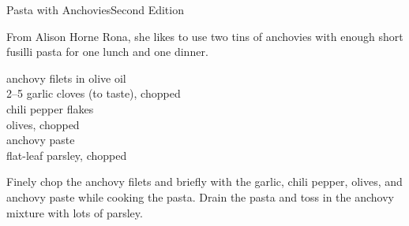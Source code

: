 \begin{entry}{Pasta with Anchovies}{Second Edition}

\begin{open}
  From Alison Horne Rona, she likes to use two tins of anchovies with enough short
  fusilli pasta for one lunch and one dinner.
\end{open}
\begin{ingredients}
    anchovy filets in olive oil\\
    \numrange{2}{5} garlic cloves (to taste), chopped\\
    chili pepper flakes\\
    olives, chopped\\
    anchovy paste\\
    flat-leaf parsley, chopped
\end{ingredients}
Finely chop the anchovy filets and briefly \saute with the garlic, chili
pepper, olives, and anchovy paste while cooking the pasta.  Drain the pasta
and toss in the anchovy mixture with lots of parsley.
\end{entry}

